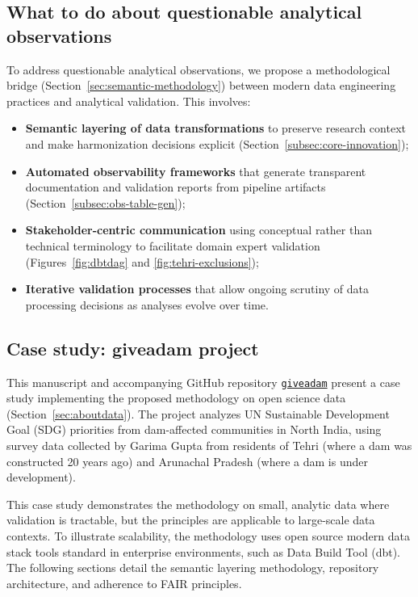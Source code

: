 \documentclass{article}
\begin{document}
\subsection{What to do about questionable analytical observations}

To address questionable analytical observations, we propose a methodological bridge (Section~\ref{sec:semantic-methodology}) between modern data engineering practices and analytical validation. This involves:
\begin{itemize}
    \item \textbf{Semantic layering of data transformations} to preserve research context and make harmonization decisions explicit (Section~\ref{subsec:core-innovation});
    \item \textbf{Automated observability frameworks} that generate transparent documentation and validation reports from pipeline artifacts (Section~\ref{subsec:obs-table-gen});
    \item \textbf{Stakeholder-centric communication} using conceptual rather than technical terminology to facilitate domain expert validation (Figures~\ref{fig:dbtdag} and \ref{fig:tehri-exclusions});
    \item \textbf{Iterative validation processes} that allow ongoing scrutiny of data processing decisions as analyses evolve over time.
\end{itemize}



\subsection{Case study: giveadam project}

This manuscript and accompanying GitHub repository \href{https://github.com/softloud/giveadam}{\texttt{giveadam}} present a case study implementing the proposed methodology on open science data (Section~\ref{sec:aboutdata}). The project analyzes UN Sustainable Development Goal (SDG) priorities from dam-affected communities in North India, using survey data collected by Garima Gupta from residents of Tehri (where a dam was constructed 20 years ago) and Arunachal Pradesh (where a dam is under development).

This case study demonstrates the methodology on small, analytic data where validation is tractable, but the principles are applicable to large-scale data contexts. To illustrate scalability, the methodology uses open source modern data stack tools standard in enterprise environments, such as Data Build Tool (dbt). The following sections detail the semantic layering methodology, repository architecture, and adherence to FAIR principles.
\end{document}
